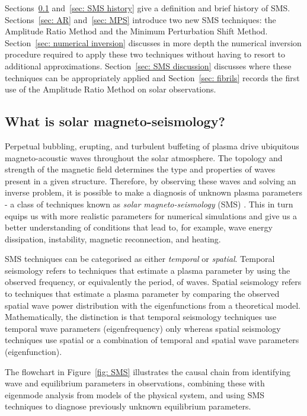 Sections~\ref{sec: what is SMS} and~\ref{sec: SMS history} give a definition and brief history of SMS. Sections~\ref{sec: AR} and~\ref{sec: MPS} introduce two new SMS techniques: the Amplitude Ratio Method and the Minimum Perturbation Shift Method. Section~\ref{sec: numerical inversion} discusses in more depth the numerical inversion procedure required to apply these two techniques without having to resort to additional approximations. Section~\ref{sec: SMS discussion} discusses where these techniques can be appropriately applied and Section~\ref{sec: fibrils} records the first use of the Amplitude Ratio Method on solar observations.


\subsection{What is solar magneto-seismology?} \label{sec: what is SMS}

Perpetual bubbling, erupting, and turbulent buffeting of plasma drive ubiquitous magneto-acoustic waves throughout the solar atmosphere. The topology and strength of the magnetic field determines the type and properties of waves present in a given structure. Therefore, by observing these waves and solving an inverse problem, it is possible to make a diagnosis of unknown plasma parameters - a class of techniques known as \textit{solar magneto-seismology} (SMS) \citep{and_etal09,arr12,dem_etal12}. This in turn equips us with more realistic parameters for numerical simulations and give us a better understanding of conditions that lead to, for example, wave energy dissipation, instability, magnetic reconnection, and heating.

SMS techniques can be categorised as either \textit{temporal} or \textit{spatial}. Temporal seismology refers to techniques that estimate a plasma parameter by using the observed frequency, or equivalently the period, of waves. Spatial seismology refers to techniques that estimate a plasma parameter by comparing the observed spatial wave power distribution with the eigenfunctions from a theoretical model. Mathematically, the distinction is that temporal seismology techniques use temporal wave parameters (eigenfrequency) only whereas spatial seismology techniques use spatial or a combination of temporal and spatial wave parameters (eigenfunction).

The flowchart in Figure~\ref{fig: SMS} illustrates the causal chain from identifying wave and equilibrium parameters in observations, combining these with eigenmode analysis from models of the physical system, and using SMS techniques to diagnose previously unknown equilibrium parameters.

